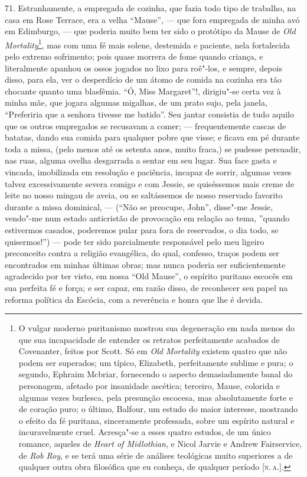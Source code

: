 71. Estranhamente, a empregada de cozinha, que fazia todo tipo de
trabalho, na casa em Rose Terrace, era a velha ``Mause'', --- que fora
empregada de minha avó em Edimburgo, --- que poderia muito bem ter sido o
protótipo da Mause de \emph{Old} \emph{Mortality}\footnote{O vulgar
  moderno puritanismo mostrou sua degeneração em nada menos do que sua
  incapacidade de entender os retratos perfeitamente acabados de
  Covenanter, feitos por Scott. Só em \emph{Old Mortality} existem
  quatro que não podem ser superados; um típico, Elizabeth,
  perfeitamente sublime e pura; o segundo, Ephraim Mcbriar, fornecendo o
  aspecto demasiadamente banal do personagem, afetado por insanidade
  ascética; terceiro, Mause, colorida e algumas vezes burlesca, pela
  presunção escocesa, mas absolutamente forte e de coração puro; o
  último, Balfour, um estudo do maior interesse, mostrando o efeito da
  fé puritana, sinceramente professada, sobre um espírito natural e
  incuravelmente cruel. Acresça"-se a esses quatro estudos, de um único
  romance, aqueles de \emph{Heart of Midlothian}, e Nicol Jarvie e
  Andrew Fairservice, de \emph{Rob Roy}, e se terá uma série de análises
  teológicas muito superiores a de qualquer outra obra filosófica que eu
  conheça, de qualquer período {[}\textsc{n.\,a.}{]}.}, mas com uma fé
mais solene, destemida e paciente, nela fortalecida pelo extremo
sofrimento; pois quase morrera de fome quando criança, e literalmente
apanhou os ossos jogados no lixo para roê"-los, e sempre, depois disso,
para ela, ver o desperdício de um átomo de comida na cozinha era tão
chocante quanto uma blasfêmia. ``Ó, Miss Margaret''!, dirigiu"-se certa
vez à minha mãe, que jogara algumas migalhas, de um prato sujo, pela
janela, ``Preferiria que a senhora tivesse me batido''. Seu jantar
consistia de tudo aquilo que os outros empregados se recusavam a comer;
--- frequentemente cascas de batatas, dando sua comida para qualquer pobre
que visse; e ficava em pé durante toda a missa, (pelo menos até os
setenta anos, muito fraca,) se pudesse persuadir, nas ruas, alguma
ovelha desgarrada a sentar em seu lugar. Sua face gasta e vincada,
imobilizada em resolução e paciência, incapaz de sorrir, algumas vezes
talvez excessivamente severa comigo e com Jessie, se quiséssemos mais
creme de leite no nosso mingau de aveia, ou se saltássemos de nosso
reservado favorito durante a missa dominical, --- (``Não se preocupe,
John'', disse"-me Jessie, vendo"-me num estado anticristão de provocação
em relação ao tema, ''quando estivermos casados, poderemos pular para
fora de reservados, o dia todo, se quisermos!'') --- pode ter sido
parcialmente responsável pelo meu ligeiro preconceito contra a religião
evangélica, do qual, confesso, traços podem ser encontrados em minhas
últimas obras; mas nunca poderia ser suficientemente agradecido por ter
visto, em nossa ``Old Mause'', o espírito puritano escocês em sua
perfeita fé e força; e ser capaz, em razão disso, de reconhecer seu
papel na reforma política da Escócia, com a reverência e honra que lhe é
devida.

